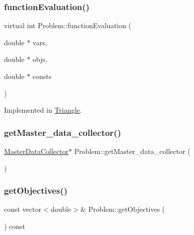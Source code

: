 \mbox{\label{classProblem_acd924a80df4422c5199748c714e9405c}} 
\subsubsection{\texorpdfstring{function\+Evaluation()}{functionEvaluation()}}
{\footnotesize\ttfamily virtual int Problem\+::function\+Evaluation (\begin{DoxyParamCaption}\item[{double $\ast$}]{vars,  }\item[{double $\ast$}]{objs,  }\item[{double $\ast$}]{consts }\end{DoxyParamCaption})\hspace{0.3cm}{\ttfamily [pure virtual]}}



Implemented in \mbox{\hyperlink{classTriangle_a9e95039d098fd61cce1a830b85ed7004}{Triangle}}.

\mbox{\label{classProblem_acf10e6a4a54da1aabea1fa8611e598dc}} 
\subsubsection{\texorpdfstring{get\+Master\+\_\+data\+\_\+collector()}{getMaster\_data\_collector()}}
{\footnotesize\ttfamily \mbox{\hyperlink{classMasterDataCollector}{Master\+Data\+Collector}}$\ast$ Problem\+::get\+Master\+\_\+data\+\_\+collector (\begin{DoxyParamCaption}{ }\end{DoxyParamCaption})}

\mbox{\label{classProblem_a64ffd22f18e26eba34013c81dc106212}} 
\subsubsection{\texorpdfstring{get\+Objectives()}{getObjectives()}}
{\footnotesize\ttfamily const vector$<$double$>$\& Problem\+::get\+Objectives (\begin{DoxyParamCaption}{ }\end{DoxyParamCaption}) const}



